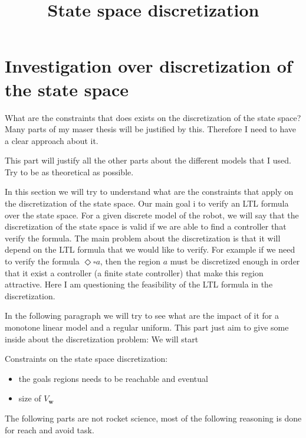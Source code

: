 \documentclass{article}
\begin{document}
\title{State space discretization}
\maketitle

\section{Investigation over discretization of the state space}
What are the constraints that does exists on the discretization of the state space?
Many parts of my maser thesis will be justified by this.
Therefore I need to have a clear approach about it.

This part will justify all the other parts about the different models that I used.
Try to be as theoretical as possible.
 


In this section we will try to understand what are the constraints that apply on the discretization of the state space.
Our main goal i to verify an LTL formula over the state space. For a given discrete model of the robot, we will say that the discretization of the state space is valid if we are able to find a controller that verify the formula.
The main problem about the discretization is that it will depend on the LTL formula that we would like to verify. For example if we need to verify the formula $\Diamond \square a$, then the region $a$ must be discretized enough in order that it exist a controller (a finite state controller) that make this region attractive.
Here I am questioning the feasibility of the LTL formula in the discretization.

In the following paragraph we will try to see what are the impact of it for a monotone linear model and a regular uniform.
This part just aim to give some inside about the discretization problem:
We will start

Constraints on the state space discretization:
\begin{itemize}[noitemsep,topsep=0pt,parsep=0pt,partopsep=0pt]
\item the goals regions needs to be reachable and eventual
\item size of $V_\mathbf{w}$
\end{itemize}

The following parts are not rocket science, most of the following reasoning is done for reach and avoid task.
\end{document}
